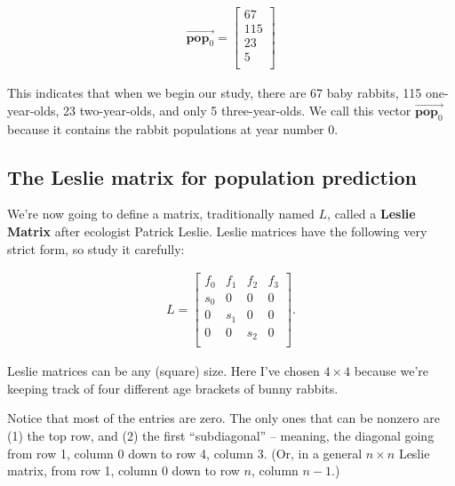 \vspace{-.15in}
\begin{align*}
\overrightarrow{\textbf{pop}_0} =
\begin{bmatrix}
67 \\ 115 \\ 23 \\ 5 \\
\end{bmatrix}
\end{align*}
\vspace{-.15in}

This indicates that when we begin our study, there are 67 baby rabbits, 115
one-year-olds, 23 two-year-olds, and only 5 three-year-olds. We call this
vector $\overrightarrow{\textbf{pop}_0}$ because it contains the rabbit
populations at year number 0.

\subsection{The Leslie matrix for population prediction}


We're now going to define a matrix, traditionally named $L$, called a
\textbf{Leslie Matrix} after ecologist Patrick Leslie. Leslie matrices have the
following very strict form, so study it carefully:

\vspace{-.15in}
\begin{align*}
L =
\begin{bmatrix}
f_0 & f_1 & f_2 & f_3 \\
s_0 & 0 & 0 & 0 \\
0 & s_1 & 0 & 0 \\
0 & 0 & s_2 & 0 \\
\end{bmatrix}.
\end{align*}
\vspace{-.15in}

Leslie matrices can be any (square) size. Here I've chosen $4\times 4$ because
we're keeping track of four different age brackets of bunny rabbits.


Notice that most of the entries are zero. The only ones that can be nonzero are
(1) the top row, and (2) the first ``subdiagonal'' -- meaning, the diagonal
going from row 1, column 0 down to row 4, column 3. (Or, in a general $n\times
n$ Leslie matrix, from row 1, column 0 down to row $n$, column $n-1$.)


